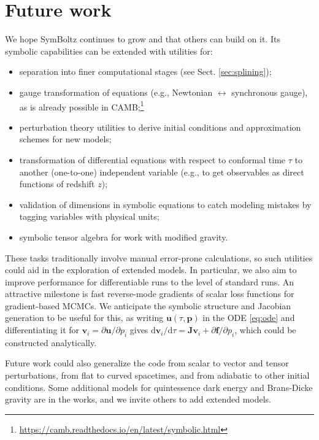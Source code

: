 \documentclass{aa}
\begin{document}
\section{Future work}
\label{sec:futurework}

We hope SymBoltz continues to grow and that others can build on it.
Its symbolic capabilities can be extended with utilities for:
\begin{itemize}
\item separation into finer computational stages (see Sect. \ref{sec:splining});
\item gauge transformation of equations (e.g., Newtonian $\leftrightarrow$ synchronous gauge), as is already possible in CAMB;\footnote{\url{https://camb.readthedocs.io/en/latest/symbolic.html}}
\item perturbation theory utilities to derive initial conditions and approximation schemes for new models;
\item transformation of differential equations with respect to conformal time $\tau$ to another (one-to-one) independent variable (e.g., to get observables as direct functions of redshift $z$);
\item validation of dimensions in symbolic equations to catch modeling mistakes by tagging variables with physical units;
\item symbolic tensor algebra for work with modified gravity.
\end{itemize}
These tasks traditionally involve manual error-prone calculations, so such utilities could aid in the exploration of extended models.
In particular, we also aim to improve performance for differentiable runs to the level of standard runs.
An attractive milestone is fast reverse-mode gradients of scalar loss functions for gradient-based MCMCs.
We anticipate the symbolic structure and Jacobian generation to be useful for this,
as writing $\boldsymbol{u}(\tau,\boldsymbol{p})$ in the ODE \eqref{eq:ode} and differentiating it for $\boldsymbol{v}_i = \partial \boldsymbol{u} / \partial p_i$ gives
$\mathrm{d}\boldsymbol{v}_i/\mathrm{d}\tau = \boldsymbol{J} \boldsymbol{v}_i + \partial \boldsymbol{f} / \partial p_i$, which could be constructed analytically.

Future work could also generalize the code from scalar to vector and tensor perturbations, from flat to curved spacetimes, and from adiabatic to other initial conditions.
Some additional models for quintessence dark energy and Brans-Dicke gravity are in the works, and we invite others to add extended models.
\end{document}
